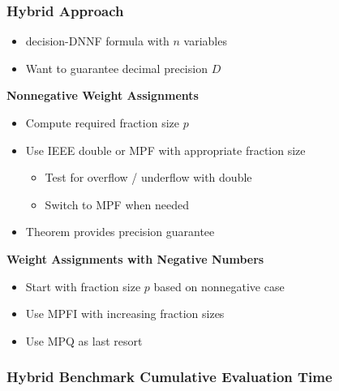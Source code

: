 \documentclass[t,pdf]{beamer}
\newcommand{\bitem}{\item[$\bullet$]}
\begin{document}
\begin{frame}

\frametitle{Hybrid Approach}

\smallskip

\begin{itemize}
\item decision-DNNF formula with $n$ variables
\item Want to guarantee decimal precision $D$
\end{itemize}

\medskip

\textbf{Nonnegative Weight Assignments}

\smallskip

\begin{itemize}
\item Compute required fraction size $p$
\item Use IEEE double or MPF with appropriate fraction size
  \begin{itemize}
    \bitem Test for overflow / underflow with double
    \bitem Switch to MPF when needed
  \end{itemize}
\item Theorem provides precision guarantee
\end{itemize}

\medskip

\textbf{Weight Assignments with Negative Numbers}

\smallskip

\begin{itemize}
\item Start with fraction size $p$ based on nonnegative case
\item Use MPFI with increasing fraction sizes
\item Use MPQ as last resort
\end{itemize}

\end{frame}

\begin{frame}

\medskip

\frametitle{Hybrid Benchmark Cumulative Evaluation Time}

  
\end{frame}
\end{document}
